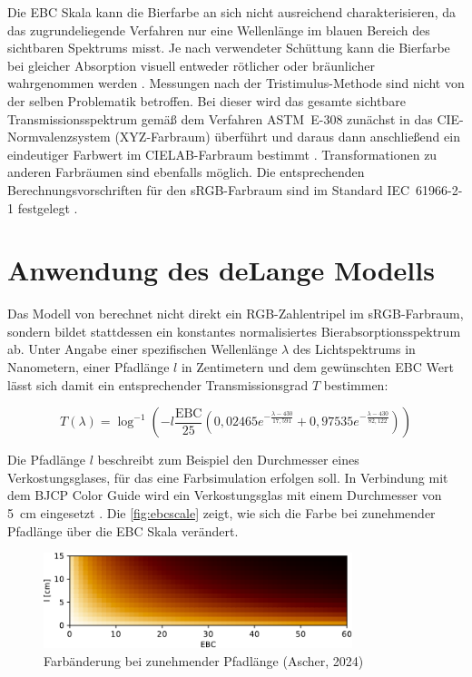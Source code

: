 \documentclass[10pt,a4paper,DIV=12,parskip=half]{scrarticle}
\begin{document}
Die EBC Skala kann die Bierfarbe an sich nicht ausreichend charakterisieren, da das zugrundeliegende Verfahren nur eine Wellenlänge im blauen Bereich des sichtbaren Spektrums misst. Je nach verwendeter Schüttung kann die Bierfarbe bei gleicher Absorption visuell entweder rötlicher oder bräunlicher wahrgenommen werden \parencite{Tucker2017}. Messungen nach der Tristimulus-Methode sind nicht von der selben Problematik betroffen. Bei dieser wird das gesamte sichtbare Transmissionsspektrum gemäß dem Verfahren ASTM~E-308 zunächst in das CIE-Normvalenzsystem (XYZ-Farbraum) überführt und daraus dann anschließend ein eindeutiger Farbwert im CIELAB-Farbraum bestimmt \parencites{deLange2016}{ASBC2011}. Transformationen zu anderen Farbräumen sind ebenfalls möglich. Die entsprechenden Berechnungsvorschriften für den sRGB-Farbraum sind im Standard IEC~61966-2-1 festgelegt \parencite{W3C2015}.

\section*{Anwendung des deLange Modells}

Das Modell von \cite{deLange2016} berechnet nicht direkt ein RGB-Zahlentripel im sRGB-Farbraum, sondern bildet stattdessen ein konstantes normalisiertes Bierabsorptionsspektrum ab. Unter Angabe einer spezifischen Wellenlänge $\lambda$ des Lichtspektrums in Nanometern, einer Pfadlänge $l$ in Zentimetern und dem gewünschten EBC Wert lässt sich damit ein entsprechender Transmissionsgrad $T$ bestimmen:

\begin{equation*}
T(\lambda)=\log^{-1}\left(-l \frac{\text{EBC}}{25} \left(0,02465e^{-\frac{\lambda-430}{17,591}}+0,97535e^{-\frac{\lambda-430}{82,122}}\right)\right)
\end{equation*}

Die Pfadlänge $l$ beschreibt zum Beispiel den Durchmesser eines Verkostungsglases, für das eine Farbsimulation erfolgen soll. In Verbindung mit dem BJCP Color Guide wird ein Verkostungsglas mit einem Durchmesser von 5~cm eingesetzt \parencite{BJCP}. Die \autoref{fig:ebcscale} zeigt, wie sich die Farbe bei zunehmender Pfadlänge über die EBC Skala verändert.

\begin{figure}[H]
	\centering
	\includegraphics[width=9cm]{ebc_scale.pdf}
	\caption{Farbänderung bei zunehmender Pfadlänge (Ascher, 2024)}
	\label{fig:ebcscale}
\end{figure}
\end{document}
